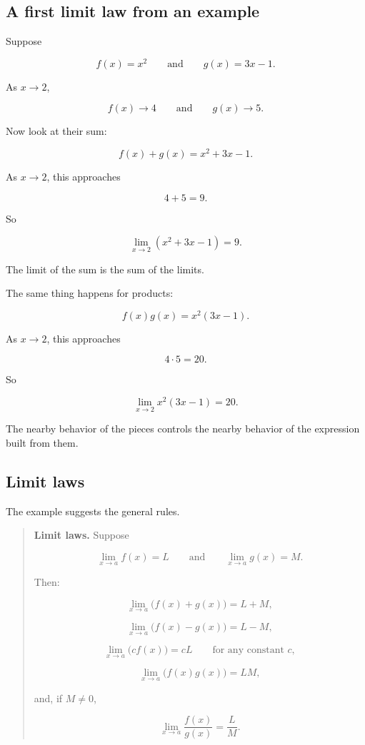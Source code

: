 \subsection{A first limit law from an example}
\label{subsec:first-limit-law-example}

Suppose

\[
f(x)=x^2
\qquad\text{and}\qquad
g(x)=3x-1.
\]

As \(x\to2\),

\[
f(x)\to4
\qquad\text{and}\qquad
g(x)\to5.
\]

Now look at their sum:

\[
f(x)+g(x)=x^2+3x-1.
\]

As \(x\to2\), this approaches

\[
4+5=9.
\]

So

\[
\lim_{x\to2}(x^2+3x-1)=9.
\]

The limit of the sum is the sum of the limits.

The same thing happens for products:

\[
f(x)g(x)=x^2(3x-1).
\]

As \(x\to2\), this approaches

\[
4\cdot5=20.
\]

So

\[
\lim_{x\to2}x^2(3x-1)=20.
\]

The nearby behavior of the pieces controls the nearby behavior of the expression built from them.

\subsection{Limit laws}
\label{subsec:limit-laws}

The example suggests the general rules.

\begin{quote}
\textbf{Limit laws.}
Suppose

\[
\lim_{x\to a}f(x)=L
\qquad\text{and}\qquad
\lim_{x\to a}g(x)=M.
\]

Then:

\[
\lim_{x\to a}\bigl(f(x)+g(x)\bigr)=L+M,
\]

\[
\lim_{x\to a}\bigl(f(x)-g(x)\bigr)=L-M,
\]

\[
\lim_{x\to a}\bigl(cf(x)\bigr)=cL
\qquad\text{for any constant }c,
\]

\[
\lim_{x\to a}\bigl(f(x)g(x)\bigr)=LM,
\]

and, if \(M\neq0\),

\[
\lim_{x\to a}\frac{f(x)}{g(x)}=\frac{L}{M}.
\]
\end{quote}

